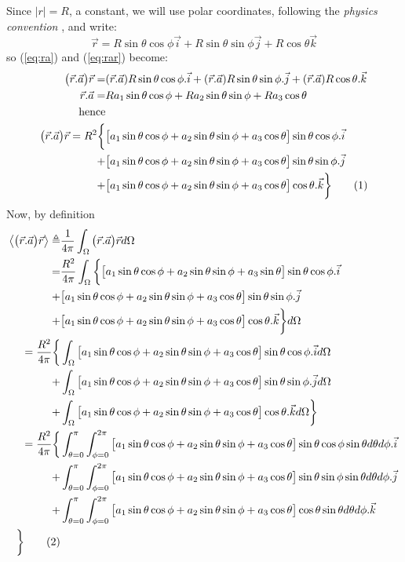 \documentclass[]{article}
\newcommand\numberthis{\addtocounter{equation}{1}\tag{\theequation}}
\begin{document}
Since $|r|=R$, a constant, we will use polar coordinates, following the \emph{physics convention} \cite{schaum-basic} \cite{wiki-polar}, and write:
$$\vec{r}=R\sin\theta\cos\phi\vec{i}+R\sin\theta\sin\phi\vec{j}+R\cos\theta\vec{k}$$
so (\ref{eq:ra}) and (\ref{eq:rar}) become:
\begin{align*}
\big(\vec{r}.\vec{a}\big)\vec{r} =& (\vec{r}.\vec{a}) R \sin\theta\cos\phi .\vec{i} + (\vec{r}.\vec{a})R\sin\theta\sin\phi . \vec{j} + (\vec{r}.\vec{a}) R\cos\theta. \vec{k}\\
\vec{r}.\vec{a} =& Ra_1\sin\theta\cos\phi + Ra_2\sin\theta\sin\phi + Ra_3 \cos\theta\\
\text{hence}&\\
\big(\vec{r}.\vec{a}\big)\vec{r} = R^2 \bigg\{& \big[a_1\sin\theta\cos\phi + a_2\sin\theta\sin\phi + a_3 \cos\theta\big] \sin\theta\cos\phi.\vec{i}\\ +& \big[a_1\sin\theta\cos\phi + a_2\sin\theta\sin\phi + a_3 \cos\theta\big]\sin\theta\sin\phi. \vec{j}\\
 +& \big[a_1\sin\theta\cos\phi + a_2\sin\theta\sin\phi + a_3 \cos\theta\big] \cos\theta. \vec{k}\bigg\}\numberthis \label{eq:rar_expanded}
\end{align*}
Now, by definition
\begin{align*}
\left\langle \big(\vec{r}.\vec{a}\big)\vec{r} \right\rangle \triangleq& \frac{1}{4\pi}\int_{\Omega}\big(\vec{r}.\vec{a}\big)\vec{r} d\Omega \\
=&  \frac{ R^2}{4\pi}\int_{\Omega} \bigg\{ \big[a_1\sin\theta\cos\phi + a_2\sin\theta\sin\phi + a_3 \sin\theta\big] \sin\theta\cos\phi.\vec{i}\\ +& \big[a_1\sin\theta\cos\phi + a_2\sin\theta\sin\phi + a_3 \cos\theta\big]\sin\theta\sin\phi .\vec{j}\\
+& \big[a_1\sin\theta\cos\phi + a_2\sin\theta\sin\phi + a_3 \cos\theta\big] \cos\theta. \vec{k}\bigg\}d\Omega\\
= \frac{ R^2}{4\pi} \bigg\{&\int_{\Omega}\big[a_1\sin\theta\cos\phi + a_2\sin\theta\sin\phi + a_3 \cos\theta\big] \sin\theta\cos\phi.\vec{i}d\Omega\\ +& \int_{\Omega}\big[a_1\sin\theta\cos\phi + a_2\sin\theta\sin\phi + a_3 \cos\theta\big]\sin\theta\sin\phi .\vec{j}d\Omega\\
+& \int_{\Omega}\big[a_1\sin\theta\cos\phi + a_2\sin\theta\sin\phi + a_3 \cos\theta\big] \cos\theta. \vec{k} d\Omega\bigg\}\\
= \frac{ R^2}{4\pi} \bigg\{&\int_{\theta=0}^{\pi}\int_{\phi=0}^{2\pi}\big[a_1\sin\theta\cos\phi + a_2\sin\theta\sin\phi + a_3 \cos\theta\big] \sin\theta\cos\phi\sin\theta d\theta d\phi.\vec{i}\\
 +& \int_{\theta=0}^{\pi}\int_{\phi=0}^{2\pi}\big[a_1\sin\theta\cos\phi + a_2\sin\theta\sin\phi + a_3 \cos\theta\big]\sin\theta\sin\phi \sin\theta d\theta d\phi.\vec{j}\\
+& \int_{\theta=0}^{\pi}\int_{\phi=0}^{2\pi}\big[a_1\sin\theta\cos\phi + a_2\sin\theta\sin\phi + a_3 \cos\theta\big] \cos\theta \sin\theta d\theta d\phi.\vec{k}\\ \bigg\} \numberthis \label{eq:big-int}
\end{align*}
\end{document}
